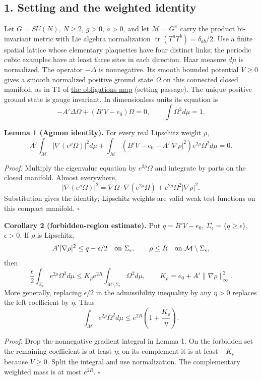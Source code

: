 \documentclass[11pt,a4paper]{article}
\begin{document}
\hypertarget{setting-and-the-weighted-identity}{%
\subsection{1. Setting and the weighted
identity}\label{setting-and-the-weighted-identity}}

Let \(G=SU(N)\), \(N\ge2\), \(g>0\), \(a>0\), and let
\(\mathcal M=G^{\mathcal E}\) carry the product bi-invariant metric with
Lie algebra normalization \(\operatorname{tr}(T^aT^b)=\delta_{ab}/2\).
Use a finite spatial lattice whose elementary plaquettes have four
distinct links; the periodic cubic examples have at least three sites in
each direction. Haar measure \(d\mu\) is normalized. The operator
\(-\Delta\) is nonnegative. Its smooth bounded potential \(V\ge0\) gives
a smooth normalized positive ground state \(\Omega\) on this connected
closed manifold, as in T1 of \href{mass-gap-obligations-lattice.md}{the
obligations map} (setting passage). The unique positive ground state is
gauge invariant. In dimensionless units its equation is
\[-A'\Delta\Omega+(B'V-e_0)\Omega=0,\qquad
\int\Omega^2d\mu=1.\]

\textbf{Lemma 1 (Agmon identity).} For every real Lipschitz weight
\(\rho\), \[A'\int_{\mathcal M}|\nabla(e^\rho\Omega)|^2d\mu
+\int_{\mathcal M}(B'V-e_0-A'|\nabla\rho|^2)e^{2\rho}\Omega^2d\mu=0.\]

\emph{Proof.} Multiply the eigenvalue equation by \(e^{2\rho}\Omega\)
and integrate by parts on the closed manifold. Almost everywhere,
\[|\nabla(e^\rho\Omega)|^2
=\nabla\Omega\cdot\nabla(e^{2\rho}\Omega)
+e^{2\rho}\Omega^2|\nabla\rho|^2.\] Substitution gives the identity;
Lipschitz weights are valid weak test functions on this compact
manifold. \(\square\)

\textbf{Corollary 2 (forbidden-region estimate).} Put \(q=B'V-e_0\),
\(\Sigma_\epsilon=\{q\ge\epsilon\}\), \(\epsilon>0\). If \(\rho\) is
Lipschitz,
\[A'|\nabla\rho|^2\le q-\epsilon/2\quad\hbox{on }\Sigma_\epsilon,
\qquad \rho\le R\quad\hbox{on }\mathcal M\setminus\Sigma_\epsilon,\]
then \[\frac\epsilon2\int_{\Sigma_\epsilon}e^{2\rho}\Omega^2d\mu
\le K_\rho e^{2R}\int_{\mathcal M\setminus\Sigma_\epsilon}\Omega^2d\mu,
\qquad K_\rho=e_0+A'\|\nabla\rho\|_\infty^2.\] More generally, replacing
\(\epsilon/2\) in the admissibility inequality by any \(\eta>0\)
replaces the left coefficient by \(\eta\). Thus
\[\int_{\mathcal M}e^{2\rho}\Omega^2d\mu
\le e^{2R}\left(1+\frac{K_\rho}{\eta}\right).\]

\emph{Proof.} Drop the nonnegative gradient integral in Lemma 1. On the
forbidden set the remaining coefficient is at least \(\eta\); on its
complement it is at least \(-K_\rho\) because \(V\ge0\). Split the
integral and use normalization. The complementary weighted mass is at
most \(e^{2R}\). \(\square\)
\end{document}
